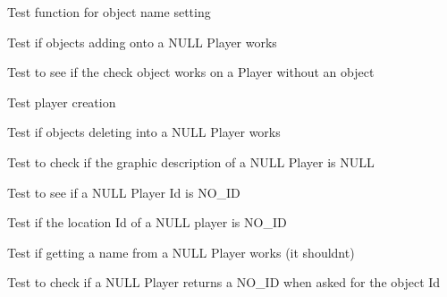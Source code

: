 \begin{DoxyRefList}
\item[\label{test__test000149}%
\hypertarget{test__test000149}{}%
Member \hyperlink{object__test_8h_acf42b7e7be91ede243f2aaa56c4c9347}{test2\+\_\+object\+\_\+set\+\_\+name} ()]Test function for object name setting  
\item[\label{test__test000190}%
\hypertarget{test__test000190}{}%
Member \hyperlink{player__test_8h_a864d3935cf61953950b10df0e656306d}{test2\+\_\+player\+\_\+add\+\_\+object} ()]Test if objects adding onto a N\+U\+LL Player works  
\item[\label{test__test000202}%
\hypertarget{test__test000202}{}%
Member \hyperlink{player__test_8h_a18d23e4d24cc31a552f264e270856a49}{test2\+\_\+player\+\_\+check\+\_\+object} ()]Test to see if the check object works on a Player without an object  
\item[\label{test__test000165}%
\hypertarget{test__test000165}{}%
Member \hyperlink{player__test_8h_a4f6eca5f9d8c08d2a7fc70c209ecf854}{test2\+\_\+player\+\_\+create} ()]Test player creation  
\item[\label{test__test000192}%
\hypertarget{test__test000192}{}%
Member \hyperlink{player__test_8h_a32008cea3e74553151b6c8c8ad1b565a}{test2\+\_\+player\+\_\+del\+\_\+object} ()]Test if objects deleting into a N\+U\+LL Player works  
\item[\label{test__test000180}%
\hypertarget{test__test000180}{}%
Member \hyperlink{player__test_8h_a94aa58d9c954a4817ea34ba7d7c17493}{test2\+\_\+player\+\_\+get\+\_\+graphic\+\_\+description} ()]Test to check if the graphic description of a N\+U\+LL Player is N\+U\+LL  
\item[\label{test__test000178}%
\hypertarget{test__test000178}{}%
Member \hyperlink{player__test_8h_a9fa80f0c0e46b45eb9f1685b102a5826}{test2\+\_\+player\+\_\+get\+\_\+id} ()]Test to see if a N\+U\+LL Player Id is N\+O\+\_\+\+ID  
\item[\label{test__test000188}%
\hypertarget{test__test000188}{}%
Member \hyperlink{player__test_8h_a4c5605fac4bd716e1dfb2744db4fa8a1}{test2\+\_\+player\+\_\+get\+\_\+location} ()]Test if the location Id of a N\+U\+LL player is N\+O\+\_\+\+ID  
\item[\label{test__test000176}%
\hypertarget{test__test000176}{}%
Member \hyperlink{player__test_8h_a3aa908fd360b74e7786422260e8e16a0}{test2\+\_\+player\+\_\+get\+\_\+name} ()]Test if getting a name from a N\+U\+LL Player works (it shouldn\textquotesingle{}t)  
\item[\label{test__test000182}%
\hypertarget{test__test000182}{}%
Member \hyperlink{player__test_8h_a83e8fea42cd87151cd67d0643a78134f}{test2\+\_\+player\+\_\+get\+\_\+object} ()]Test to check if a N\+U\+LL Player returns a N\+O\+\_\+\+ID when asked for the object Id  

\end{DoxyRefList}
